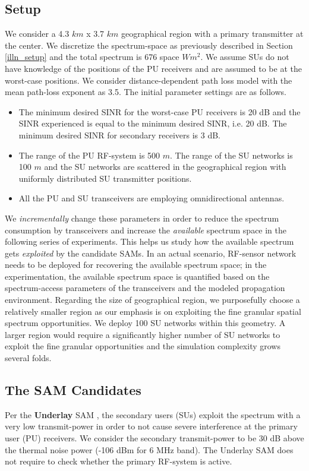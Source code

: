 \documentclass[12pt, draftclsnofoot, onecolumn]{IEEEtran}
\begin{document}
\subsection{Setup}
We consider a 4.3 $km$ x 3.7 $km$ geographical region with a primary transmitter at the center. We discretize the spectrum-space as previously described in Section \ref{illn_setup} and the total spectrum is 676 space $Wm^2$. We assume SUs do not have knowledge of the positions of the PU receivers and  are assumed to be at the worst-case positions. We consider distance-dependent path loss model with the mean path-loss exponent as 3.5. The initial parameter settings are as follows.
\begin{itemize}
	\item The minimum desired SINR for the worst-case PU receivers is 20 dB and the SINR experienced is equal to the minimum desired SINR, i.e. 20 dB. The  minimum desired SINR for secondary receivers is 3 dB.
	\item The range of the PU RF-system is 500 $m$. The range of the SU networks is 100 $m$ and the SU networks are scattered in the geographical region with uniformly distributed SU transmitter positions. 
	\item All the PU and SU transceivers are employing omnidirectional antennas.  
\end{itemize}
We \textit{incrementally} change these parameters in order to reduce the spectrum consumption  by transceivers and increase the \textit{available} spectrum space in the following series of experiments.  This helps us study how the available spectrum gets \textit{exploited} by the candidate SAMs. In an actual scenario, RF-sensor network needs to be deployed for recovering the available spectrum space; in the experimentation, the available spectrum space is quantified based on the spectrum-access parameters of the transceivers and the modeled propagation environment. Regarding the size of geographical region, we purposefully choose a relatively smaller region as our emphasis is on exploiting the fine granular spatial spectrum opportunities. We deploy 100 SU networks within this geometry. A larger region would require a significantly higher number of SU networks to exploit the fine granular opportunities and the simulation complexity grows several folds. 

\subsection{The SAM Candidates}
Per the \textbf{Underlay} SAM \cite{dsa_survey}, the secondary users (SUs) exploit the spectrum with a very low transmit-power in order to not cause severe interference at the primary user (PU) receivers. We consider the secondary transmit-power to be 30 dB above the thermal noise power (-106 dBm for 6 MHz band). The Underlay SAM does not require to check whether the primary RF-system is active.
\end{document}
